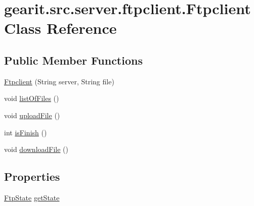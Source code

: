 \hypertarget{classgearit_1_1src_1_1server_1_1ftpclient_1_1_ftpclient}{\section{gearit.\+src.\+server.\+ftpclient.\+Ftpclient Class Reference}
\label{classgearit_1_1src_1_1server_1_1ftpclient_1_1_ftpclient}
}
\subsection*{Public Member Functions}
\begin{DoxyCompactItemize}
\item 
\hyperlink{classgearit_1_1src_1_1server_1_1ftpclient_1_1_ftpclient_a0ecdca7f40f454808326f74f5c1702d6}{Ftpclient} (String server, String file)
\item 
void \hyperlink{classgearit_1_1src_1_1server_1_1ftpclient_1_1_ftpclient_a1c2a2b100fb88204868b75ee99c7fbcd}{list\+Of\+Files} ()
\item 
void \hyperlink{classgearit_1_1src_1_1server_1_1ftpclient_1_1_ftpclient_af179be2c872625f39efd5d8e4be957cb}{upload\+File} ()
\item 
int \hyperlink{classgearit_1_1src_1_1server_1_1ftpclient_1_1_ftpclient_a36f630afa7a752181a21509f276881a7}{is\+Finish} ()
\item 
void \hyperlink{classgearit_1_1src_1_1server_1_1ftpclient_1_1_ftpclient_a7080e47e234142f12f061ea5875b92c5}{download\+File} ()
\end{DoxyCompactItemize}
\subsection*{Properties}
\begin{DoxyCompactItemize}
\item 
\hyperlink{classgearit_1_1src_1_1server_1_1ftpclient_1_1_ftp_state}{Ftp\+State} \hyperlink{classgearit_1_1src_1_1server_1_1ftpclient_1_1_ftpclient_a0bbed9a36c185eaf856c74d638909ef4}{get\+State}
\end{DoxyCompactItemize}


